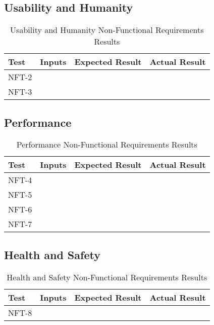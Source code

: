 \documentclass[12pt, titlepage]{article}
\begin{document}
\subsection{Usability and Humanity}

\begin{table}[H]
  \centering
    \setlength{\leftmargini}{0cm}
    \begin{tabular}{| >{\centering\arraybackslash}m{1.5cm} | 
      >{\centering\arraybackslash}m{4cm} | 
      >{\centering\arraybackslash}m{4cm} | 
      >{\centering\arraybackslash}m{4cm} |}
    \hline
    \rowcolor[gray]{0.9}
    Test & Inputs & Expected Result & Actual Result\\
    \hline
    NFT-2 &  &  & \\
    \hline
    NFT-3 &  &  & \\
    \hline
    \end{tabular}
  \caption{Usability and Humanity Non-Functional Requirements Results}
\end{table}

\subsection{Performance}

\begin{table}[H]
  \centering
    \setlength{\leftmargini}{0cm}
    \begin{tabular}{| >{\centering\arraybackslash}m{1.5cm} | 
      >{\centering\arraybackslash}m{4cm} | 
      >{\centering\arraybackslash}m{4cm} | 
      >{\centering\arraybackslash}m{4cm} |}
    \hline
    \rowcolor[gray]{0.9}
    Test & Inputs & Expected Result & Actual Result\\
    \hline
    NFT-4 &  &  & \\
    \hline
    NFT-5 &  &  & \\
    \hline
    NFT-6 &  &  & \\
    \hline
    NFT-7 &  &  & \\
    \hline
    \end{tabular}
  \caption{Performance Non-Functional Requirements Results}
\end{table}

\subsection{Health and Safety}

\begin{table}[H]
  \centering
    \setlength{\leftmargini}{0cm}
    \begin{tabular}{| >{\centering\arraybackslash}m{1.5cm} | 
      >{\centering\arraybackslash}m{4cm} | 
      >{\centering\arraybackslash}m{4cm} | 
      >{\centering\arraybackslash}m{4cm} |}
    \hline
    \rowcolor[gray]{0.9}
    Test & Inputs & Expected Result & Actual Result\\
    \hline
    NFT-8 &  &  & \\
    \hline
    \end{tabular}
  \caption{Health and Safety Non-Functional Requirements Results}
\end{table}
\end{document}
